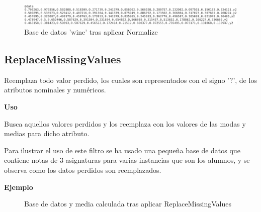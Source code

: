 	\begin{figure}[!htp]
	\centering
	\includegraphics[scale=.32]{./figuras/image21.png}
	\caption{Base de datos 'wine' tras aplicar Normalize}
	\label{fig:normalize2}
	\end{figure}

	\subsection{ReplaceMissingValues}
	Reemplaza todo valor perdido, los cuales son representados con el signo '?', de los atributos nominales y numéricos.

	\begin{justify}
	\textbf{Uso} 
	\end{justify}

	Busca aquellos valores perdidos y los reemplaza con los valores de las modas y medias para dicho atributo.

	Para ilustrar el uso de este filtro se ha usado una pequeña base de datos que contiene notas de 3 asignaturas para varias instancias que son los alumnos, y se observa como los datos perdidos son reemplazados.

	
	\begin{justify}
	\textbf{Ejemplo}
	\end{justify}

	\begin{figure}[!htp]

	\centering
	\caption{Base de datos y media calculada tras aplicar ReplaceMissingValues}
	\end{figure}
  
